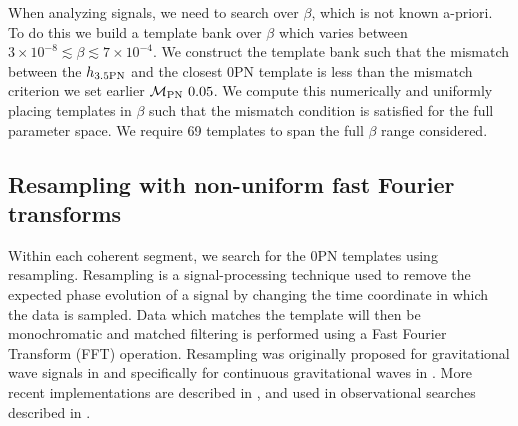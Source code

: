 \documentclass[aps,prd,amsmath,floats,floatfix, twocolumn,
superscriptaddress,nofootinbib,showpacs]{revtex4-2}
\begin{document}
When analyzing signals, we need to search over $\beta$, which is not known a-priori. To do this we build a template bank over $\beta$ which varies between $3\times10^{-8} \lesssim \beta  \lesssim 7\times10^{-4}$. We construct the template bank such that the mismatch between the $h_{\rm 3.5PN}$ and the closest 0PN template is less than the mismatch criterion we set earlier $\mathcal{M}_{\rm PN} \ 0.05$. We compute this numerically and uniformly placing templates in $\beta$ such that the mismatch condition is satisfied for the full parameter space. We require 69 templates to span the full $\beta$ range considered. 

\subsection{Resampling with non-uniform fast Fourier transforms}
\label{sec:resampling}
Within each coherent segment, we search for the 0PN templates using resampling. Resampling is a signal-processing technique used to remove the expected phase evolution of a signal by changing the time coordinate in which the data is sampled. Data which matches the template will then be monochromatic and matched filtering is performed using a Fast Fourier Transform (FFT) operation. Resampling was originally proposed for gravitational wave signals in \cite{Smith:1987hh} and specifically for continuous gravitational waves in \cite{livasBroadbandSearchTechniques1989, Jaranowski:1998qm, Astone:2010ct, Braccini:2011zz}. More recent implementations are described in \cite{Astone:2014dea, Mastrogiovanni:2017xjr, Meadors:2017pefa, Singhal:2019dfn}, and used in observational searches described in \cite{LIGOScientific:2026qsb, LIGOScientific:2017ytx}. 
\end{document}
